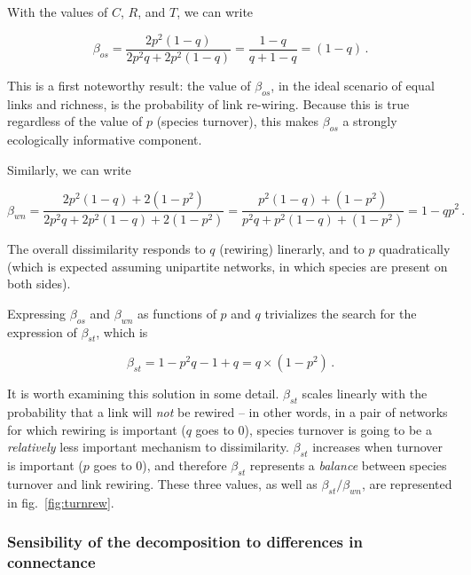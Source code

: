 \documentclass[11pt]{article}
\begin{document}
With the values of \(C\), \(R\), and \(T\), we can write

\[\beta_{os} = \frac{2p^2(1-q)}{2p^2q+2p^2(1-q)} = \frac{1-q}{q + 1 -q} =
(1-q)\,.\]

This is a first noteworthy result: the value of \(\beta_{os}\), in the
ideal scenario of equal links and richness, is the probability of link
re-wiring. Because this is true regardless of the value of \(p\)
(species turnover), this makes \(\beta_{os}\) a strongly ecologically
informative component.

Similarly, we can write

\[\beta_{wn} = \frac{2p^2(1-q)+2(1-p^2)}{2p^2q + 2p^2(1-q)+2(1-p^2)} = \frac{p^2(1-q)+(1-p^2)}{p^2q+p^2(1-q)+(1-p^2)} = 1-qp^2\,.\]

The overall dissimilarity responds to \(q\) (rewiring) linerarly, and to
\(p\) quadratically (which is expected assuming unipartite networks, in
which species are present on both sides).

Expressing \(\beta_{os}\) and \(\beta_{wn}\) as functions of \(p\) and
\(q\) trivializes the search for the expression of \(\beta_{st}\), which
is

\[\beta_{st} = 1 - p^2q - 1 + q = q\times(1-p^2)\,.\]

It is worth examining this solution in some detail. \(\beta_{st}\)
scales linearly with the probability that a link will \emph{not} be
rewired -- in other words, in a pair of networks for which rewiring is
important (\(q\) goes to 0), species turnover is going to be a
\emph{relatively} less important mechanism to dissimilarity.
\(\beta_{st}\) increases when turnover is important (\(p\) goes to 0),
and therefore \(\beta_{st}\) represents a \emph{balance} between species
turnover and link rewiring. These three values, as well as
\(\beta_{st}/\beta_{wn}\), are represented in fig.~\ref{fig:turnrew}.

\hypertarget{sensibility-of-the-decomposition-to-differences-in-connectance}{%
\subsubsection{Sensibility of the decomposition to differences in
connectance}\label{sensibility-of-the-decomposition-to-differences-in-connectance}}
\end{document}
